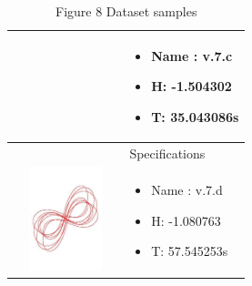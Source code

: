 \begin{table}[H]
\begin{tabular}{ | c | m{5cm}| }
\begin{minipage}{.3\textwidth}
		\end{minipage}
		&
		\begin{itemize}
			\item Name : v.7.c
			\item H: -1.504302
			\item T: 35.043086s
		\end{itemize}\\
		\hline
		& Specifications\\ 
		\begin{minipage}{.3\textwidth}
			\includegraphics[width=30mm, height=30mm]{chapters/chapter5/v7d.pdf}
		\end{minipage}
		&
		\begin{itemize}
			\item Name : v.7.d
			\item H: -1.080763
			\item T: 57.545253s
		\end{itemize}\\
		\hline
	\end{tabular}
	\caption{Figure 8 Dataset samples\cite{web}}\label{diverse}
	\label{fig8}
\end{table}

